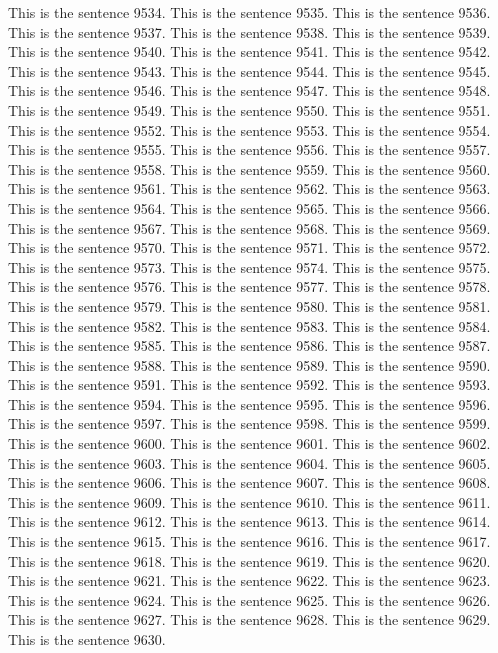 \documentclass{article}
\begin{document}
This is the sentence 9534.
This is the sentence 9535.
This is the sentence 9536.
This is the sentence 9537.
This is the sentence 9538.
This is the sentence 9539.
This is the sentence 9540.
This is the sentence 9541.
This is the sentence 9542.
This is the sentence 9543.
This is the sentence 9544.
This is the sentence 9545.
This is the sentence 9546.
This is the sentence 9547.
This is the sentence 9548.
This is the sentence 9549.
This is the sentence 9550.
This is the sentence 9551.
This is the sentence 9552.
This is the sentence 9553.
This is the sentence 9554.
This is the sentence 9555.
This is the sentence 9556.
This is the sentence 9557.
This is the sentence 9558.
This is the sentence 9559.
This is the sentence 9560.
This is the sentence 9561.
This is the sentence 9562.
This is the sentence 9563.
This is the sentence 9564.
This is the sentence 9565.
This is the sentence 9566.
This is the sentence 9567.
This is the sentence 9568.
This is the sentence 9569.
This is the sentence 9570.
This is the sentence 9571.
This is the sentence 9572.
This is the sentence 9573.
This is the sentence 9574.
This is the sentence 9575.
This is the sentence 9576.
This is the sentence 9577.
This is the sentence 9578.
This is the sentence 9579.
This is the sentence 9580.
This is the sentence 9581.
This is the sentence 9582.
This is the sentence 9583.
This is the sentence 9584.
This is the sentence 9585.
This is the sentence 9586.
This is the sentence 9587.
This is the sentence 9588.
This is the sentence 9589.
This is the sentence 9590.
This is the sentence 9591.
This is the sentence 9592.
This is the sentence 9593.
This is the sentence 9594.
This is the sentence 9595.
This is the sentence 9596.
This is the sentence 9597.
This is the sentence 9598.
This is the sentence 9599.
This is the sentence 9600.
This is the sentence 9601.
This is the sentence 9602.
This is the sentence 9603.
This is the sentence 9604.
This is the sentence 9605.
This is the sentence 9606.
This is the sentence 9607.
This is the sentence 9608.
This is the sentence 9609.
This is the sentence 9610.
This is the sentence 9611.
This is the sentence 9612.
This is the sentence 9613.
This is the sentence 9614.
This is the sentence 9615.
This is the sentence 9616.
This is the sentence 9617.
This is the sentence 9618.
This is the sentence 9619.
This is the sentence 9620.
This is the sentence 9621.
This is the sentence 9622.
This is the sentence 9623.
This is the sentence 9624.
This is the sentence 9625.
This is the sentence 9626.
This is the sentence 9627.
This is the sentence 9628.
This is the sentence 9629.
This is the sentence 9630.
\end{document}
